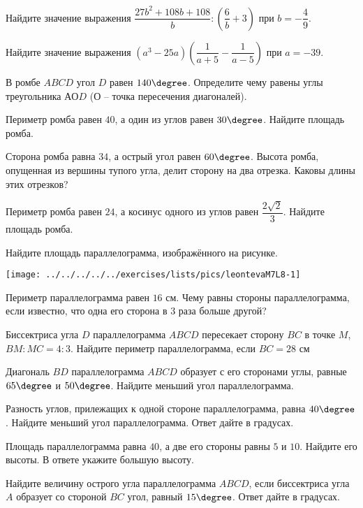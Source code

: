 \begin{class}[number=8]
	\begin{listofex}
		\item Найдите значение выражения   \( \dfrac{27b^{2}+108b+108}{b}:\left( \dfrac{6}{b}+3 \right) \) при \( b = - \dfrac{4}{9}\). 
		\item Найдите значение выражения \( (a^{3}-25a )\left( \dfrac{1}{a+5}-\dfrac{1}{a-5} \right)\) при \( a =-39 \).
		\item В ромбе \( ABCD \) угол \( D \) равен \( 140\degree \). Определите чему равены углы треугольника \( АОD \) (\( О \) – точка пересечения диагоналей).
		\item Периметр ромба равен \( 40 \), а один из углов равен \( 30\degree \). Найдите площадь ромба.
		\item Сторона ромба равна \( 34 \), а острый угол равен \( 60\degree \). Высота ромба, опущенная из вершины тупого угла, делит сторону на два отрезка. Каковы длины этих отрезков?
		\item Периметр ромба равен \( 24 \), а косинус одного из углов равен  \( \dfrac{2 \sqrt{2}}{3} \).  Найдите площадь ромба.
		\item \begin{minipage}[t]{\bodywidth}
			Найдите площадь параллелограмма, изображённого на рисунке.
		\end{minipage}
		\hspace{0.02\linewidth}
		\begin{minipage}[t]{\picwidth}
			\texttt{[image: ../../../../../exercises/lists/pics/leontevaM7L8-1]}
		\end{minipage}
		
		
		
		\item Периметр параллелограмма равен \( 16 \) см. Чему равны стороны параллелограмма, если известно, что одна его сторона в \( 3 \) раза больше другой?
		\item Биссектриса угла \( D \) параллелограмма \( ABCD \) пересекает сторону \( BC \) в точке \( M \), \( BM:MC = 4:3 \). Найдите периметр параллелограмма, если \( BC = 28 \) см
		\item Диагональ \( BD \) параллелограмма \( ABCD \) образует с его сторонами углы, равные \( 65\degree \) и \( 50\degree \). Найдите меньший угол параллелограмма.
		\item Разность углов, прилежащих к одной стороне параллелограмма, равна \( 40\degree \). Найдите меньший угол параллелограмма. Ответ дайте в градусах.
		\item Площадь параллелограмма равна \( 40 \), а две его стороны равны \( 5 \) и \( 10 \). Найдите его высоты. В ответе укажите большую высоту.
		\item Найдите величину острого угла параллелограмма \( ABCD \), если биссектриса угла \( A \) образует со стороной \( BC \) угол, равный \( 15\degree \). Ответ дайте в градусах.
	\end{listofex}
\end{class}
